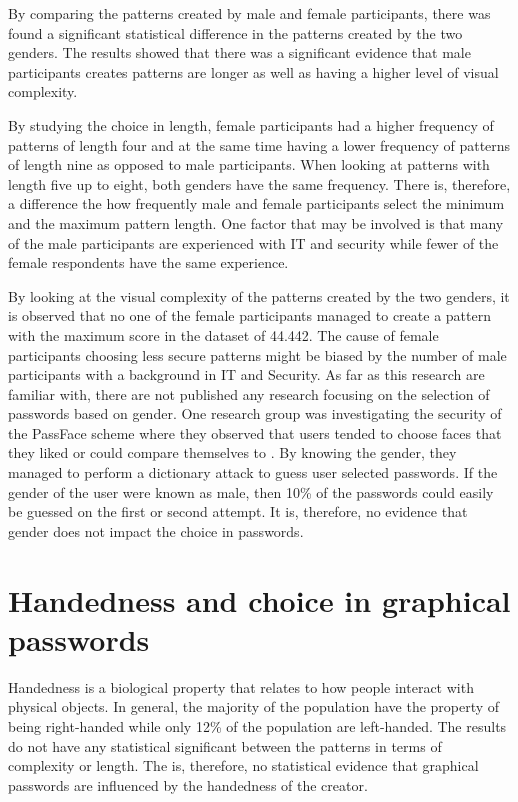     By comparing the patterns created by male and female participants, there was found a significant statistical difference in the patterns created by the two genders. The results showed that there was a significant evidence that male participants creates patterns are longer as well as having a higher level of visual complexity.

    By studying the choice in length, female participants had a higher frequency of patterns of length four and at the same time having a lower frequency of patterns of length nine as opposed to male participants. When looking at patterns with length five up to eight, both genders have the same frequency. There is, therefore, a difference the how frequently male and female participants select the minimum and the maximum pattern length. One factor that may be involved is that many of the male participants are experienced with IT and security while fewer of the female respondents have the same experience. 

    By looking at the visual complexity of the patterns created by the two genders, it is observed that no one of the female participants managed to create a pattern with the maximum score in the dataset of 44.442.  The cause of female participants choosing less secure patterns might be biased by the number of male participants with a background in IT and Security.  As far as this research are familiar with, there are not published any research focusing on the selection of passwords based on gender. One research group was investigating the security of the PassFace scheme where they observed that users tended to choose faces that they liked or could compare themselves to \cite{Davis}. By knowing the gender, they managed to perform a dictionary attack to guess user selected passwords. If the gender of the user were known as male, then 10\% of the passwords could easily be guessed on the first or second attempt. It is, therefore, no evidence that gender does not impact the choice in passwords.
    
  \section{Handedness and choice in graphical passwords}
    
    Handedness is a biological property that relates to how people interact with physical objects. In general, the majority of the population have the property of being right-handed while only 12\% of the population are left-handed. The results do not have any statistical significant between the patterns in terms of complexity or length. The is, therefore, no statistical evidence that graphical passwords are influenced by the handedness of the creator.

